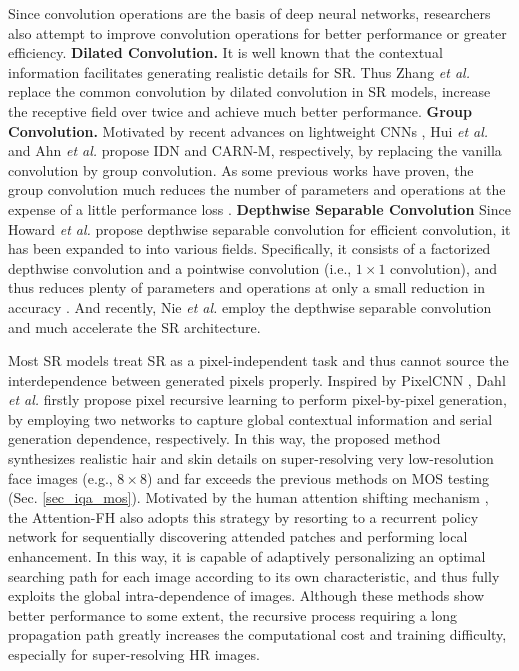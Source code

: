 {\label{sec_advanced_convolution}
Since convolution operations are the basis of deep neural networks, researchers also attempt to improve convolution operations for better performance or greater efficiency.
\textbf{Dilated Convolution.}
It is well known that the contextual information facilitates generating realistic details for SR.
Thus Zhang \textit{et al.}  replace the common convolution by dilated convolution in SR models, increase the receptive field over twice and achieve much better performance.
\textbf{Group Convolution.}
Motivated by recent advances on lightweight CNNs , Hui \textit{et al.}  and Ahn \textit{et al.}  propose IDN and CARN-M, respectively, by replacing the vanilla convolution by group convolution.
As some previous works have proven, the group convolution much reduces the number of parameters and operations at the expense of a little performance loss .
\textbf{Depthwise Separable Convolution}
Since Howard \textit{et al.}  propose depthwise separable convolution for efficient convolution, it has been expanded to into various fields.
Specifically, it consists of a factorized depthwise convolution and a pointwise convolution (i.e., $1 \times 1$ convolution), and thus reduces plenty of parameters and operations at only a small reduction in accuracy .
And recently, Nie \textit{et al.}  employ the depthwise separable convolution and much accelerate the SR architecture.

\label{sec_region_recursive_learning}
Most SR models treat SR as a pixel-independent task and thus cannot source the interdependence between generated pixels properly.
Inspired by PixelCNN , Dahl \textit{et al.}  firstly propose pixel recursive learning to perform pixel-by-pixel generation, by employing two networks to capture global contextual information and serial generation dependence, respectively.
In this way, the proposed method synthesizes realistic hair and skin details on super-resolving very low-resolution face images (e.g., $8\times 8$) and far exceeds the previous methods on MOS testing  (Sec. \ref{sec_iqa_mos}).
Motivated by the human attention shifting mechanism , the Attention-FH  also adopts this strategy by resorting to a recurrent policy network for sequentially discovering attended patches and performing local enhancement.
In this way, it is capable of adaptively personalizing an optimal searching path for each image according to its own characteristic, and thus fully exploits the global intra-dependence of images.
Although these methods show better performance to some extent, the recursive process requiring a long propagation path greatly increases the computational cost and training difficulty, especially for super-resolving HR images.

}
